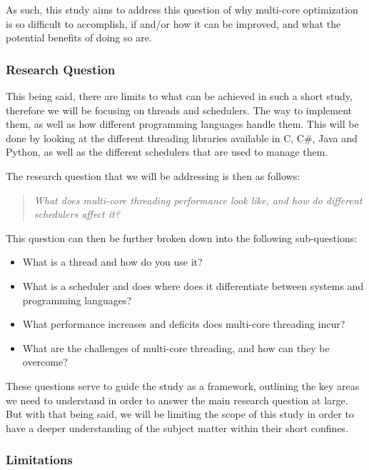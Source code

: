 \documentclass[12pt,a4paper]{article}
\begin{document}
As such, this study aims to address this question of why multi-core optimization is so difficult to accomplish, if and/or how it can be improved, and what the potential benefits of doing so are. 

\subsubsection{Research Question}

This being said, there are limits to what can be achieved in such a short study, therefore we will be focusing on threads and schedulers. The way to implement them, as well as how different programming languages handle them. This will be done by looking at the different threading libraries available in C, C\#, Java and Python, as well as the different schedulers that are used to manage them.

The research question that we will be addressing is then as follows:

\begin{quote}
    \textit{What does multi-core threading performance look like, and how do different schedulers affect it?}
\end{quote}

This question can then be further broken down into the following sub-questions:

\begin{itemize}
    \item What is a thread and how do you use it?
    \item What is a scheduler and does where does it differentiate between systems and programming languages?
    \item What performance increases and deficits does multi-core threading incur?
    \item What are the challenges of multi-core threading, and how can they be overcome?
\end{itemize}

These questions serve to guide the study as a framework, outlining the key areas we need to understand in order to answer the main research question at large. But with that being said, we will be limiting the scope of this study in order to have a deeper understanding of the subject matter within their short confines.

\subsubsection{Limitations}
\end{document}
